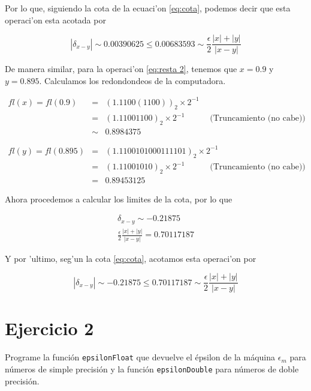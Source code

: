\documentclass[11pt]{article}
\begin{document}
Por lo que, siguiendo la cota de la ecuaci'on \ref{eq:cota}, podemos
decir que esta operaci'on esta acotada por

\begin{equation*}
    |\delta_{x-y}| \sim 0.00390625 \leq 0.00683593 \sim \frac{\epsilon}{2}\frac{|x|+|y|}{|x-y|}
\end{equation*}

    De manera similar, para la operaci'on \ref{eq:resta 2}, tenemos que
\(x=0.9\) y \(y=0.895\). Calculamos los redondondeos de la computadora.

\begin{eqnarray*}
     fl(x) = fl(0.9) &=& (1.1100(1100))_2\times 2^{-1} \\
             &=& (1.11001100)_2\times 2^{-1}  \quad\quad\quad \text{(Truncamiento (no cabe))} \\
             &\sim& 0.8984375
             \\&&\\&&\\
     fl(y) = fl(0.895) &=& (1.1100101000111101)_2\times 2^{-1} \\
             &=& (1.11001010)_2\times 2^{-1}  \quad\quad\quad \text{(Truncamiento (no cabe))} \\
             &=& 0.89453125
 \end{eqnarray*}

Ahora procedemos a calcular los limites de la cota, por lo que

\begin{eqnarray*}
    \delta_{x-y} \sim  -0.21875\\
    \frac{\epsilon}{2}\frac{|x|+|y|}{|x-y|} = 0.70117187
\end{eqnarray*}

Y por 'ultimo, seg'un la cota \ref{eq:cota}, acotamos esta operaci'on
por

\begin{equation*}
    |\delta_{x-y}| \sim -0.21875 \leq 0.70117187 \sim \frac{\epsilon}{2}\frac{|x|+|y|}{|x-y|}
\end{equation*}

\newpage
    \hypertarget{ejercicio-2}{%
\section{Ejercicio 2}\label{ejercicio-2}}

    Programe la función \texttt{epsilonFloat} que devuelve el épsilon de la
máquina \(\epsilon_m\) para números de simple precisión y la función
\texttt{epsilonDouble} para números de doble precisión.
\end{document}
